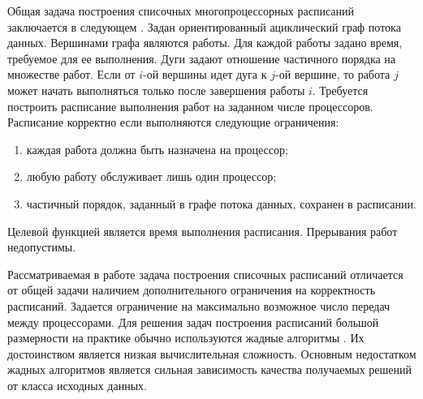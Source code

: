Общая задача построения списочных многопроцессорных расписаний заключается в следующем \cite{Shakhbazyan_1981,Coffman}. Задан ориентированный ациклический граф потока данных. Вершинами графа являются работы. Для каждой работы задано время, требуемое для ее выполнения. Дуги задают отношение частичного порядка на множестве работ. Если от $i$-ой вершины идет дуга к $j$-ой вершине, то работа $j$ может начать выполняться только после завершения работы $i$. Требуется построить расписание выполнения работ на заданном числе процессоров. Расписание корректно если выполняются следующие ограничения:
\begin{enumerate}
    \item каждая работа должна быть назначена на процессор;
    \item любую работу обслуживает лишь один процессор;
    \item частичный порядок, заданный в графе потока данных, сохранен в расписании.
\end{enumerate}

Целевой функцией является время выполнения расписания. Прерывания работ недопустимы.

Рассматриваемая в работе задача построения списочных расписаний отличается от общей задачи наличием дополнительного ограничения на корректность расписаний. Задается ограничение на максимально возможное число передач между процессорами. Для решения задач построения расписаний большой размерности на практике обычно используются жадные алгоритмы \cite{Cormen}. Их достоинством является низкая вычислительная сложность. Основным недостатком жадных алгоритмов является сильная зависимость качества получаемых решений от класса исходных данных.


